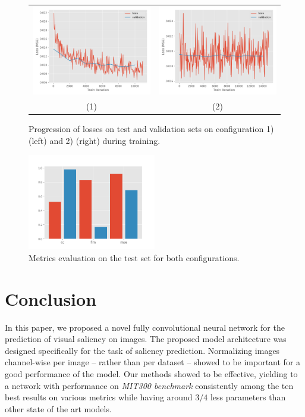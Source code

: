 \documentclass[10pt,twocolumn,letterpaper]{article}
\begin{document}
\begin{figure}
\begin{center}
\begin{tabular} {cc}
\includegraphics[width=0.45\linewidth]{./img/lab_perimg_losses.png} &
\includegraphics[width=0.45\linewidth]{./img/rgb_perdset_losses.png}\\
(1) & (2)
\end{tabular}
\caption{Progression of losses on test and validation
    sets on configuration 1) (left) and 2) (right) during training.}
\label{fig:confs_losses}
\end{center}
\end{figure}

\begin{center}
\begin{figure}[t]
\includegraphics[width=0.5\textwidth]{./img/metrics.png}
\caption{Metrics evaluation on the test set for both configurations.}
\label{fig:confs_metrics}
\end{figure}
\end{center}

\section{Conclusion}
In this paper, we proposed a novel fully convolutional neural network for the
prediction of visual saliency on images.
The proposed model architecture was designed specifically
for the task of saliency prediction.
Normalizing images channel-wise per image -- rather than per dataset -- showed
to be important for a good performance of the model.
Our methods showed to be effective, yielding to a network with performance
on \emph{MIT300 benchmark} consistently among the ten best results on various
metrics while having around $3/4$  less parameters than other state of
the art models.

{\small


}
\end{document}
